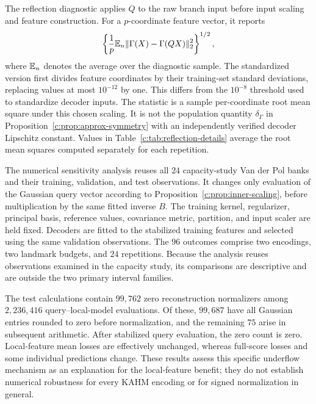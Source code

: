 The reflection diagnostic applies $Q$ to the raw branch input before
input scaling and feature construction. For a $p$-coordinate feature
vector, it reports
\[
 \left\{\frac1p\mathbb{E}_n\|\Gamma(X)-\Gamma(QX)\|_2^2\right\}^{1/2},
\]
where $\mathbb{E}_n$ denotes the average over the diagnostic sample. The
standardized version first divides feature coordinates by their
training-set standard deviations, replacing values at most $10^{-12}$
by one. This differs from the $10^{-8}$ threshold used to standardize
decoder inputs. The statistic is a sample per-coordinate root mean
square under this chosen scaling. It is not the population quantity
$\delta_\Gamma$ in Proposition~\ref{c:prop:approx-symmetry} with an
independently verified decoder Lipschitz constant. Values in
Table~\ref{c:tab:reflection-details} average the root mean squares
computed separately for each repetition.

The numerical sensitivity analysis reuses all $24$ capacity-study
Van der Pol banks and their training, validation, and test observations.
It changes only evaluation of the Gaussian query vector according to
Proposition~\ref{c:prop:inner-scaling}, before multiplication by the
same fitted inverse $B$. The training kernel, regularizer, principal
basis, reference values, covariance metric, partition, and input
scaler are held fixed. Decoders are fitted to the stabilized training
features and selected using the same validation observations.
The $96$ outcomes comprise two encodings, two landmark budgets, and
$24$ repetitions. Because the analysis reuses observations examined
in the capacity study, its comparisons are descriptive and are outside
the two primary interval families.

The test calculations contain $99{,}762$ zero reconstruction
normalizers among $2{,}236{,}416$ query--local-model evaluations.
Of these, $99{,}687$ have all Gaussian entries rounded to zero before
normalization, and the remaining $75$ arise in subsequent arithmetic.
After stabilized query evaluation, the zero count is zero. Local-feature
mean losses are effectively unchanged, whereas full-score losses and
some individual predictions change. These results assess this specific
underflow mechanism as an explanation for the local-feature benefit;
they do not establish numerical robustness for every KAHM encoding or
for signed normalization in general.

